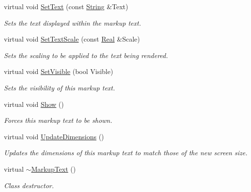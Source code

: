 \begin{DoxyCompactItemize}
virtual void \hyperlink{classMezzanine_1_1UI_1_1MarkupText_aaf712f1b14c1daa74493a7157d1ca789}{SetText} (const \hyperlink{namespaceMezzanine_acf9fcc130e6ebf08e3d8491aebcf1c86}{String} \&Text)
\begin{DoxyCompactList}\small\item\em Sets the text displayed within the markup text. \item\end{DoxyCompactList}\item 
virtual void \hyperlink{classMezzanine_1_1UI_1_1MarkupText_a72af2f6757e01ede3cc6a19b3021c178}{SetTextScale} (const \hyperlink{namespaceMezzanine_a726731b1a7df72bf3583e4a97282c6f6}{Real} \&Scale)
\begin{DoxyCompactList}\small\item\em Sets the scaling to be applied to the text being rendered. \item\end{DoxyCompactList}\item 
virtual void \hyperlink{classMezzanine_1_1UI_1_1MarkupText_acce9a32cef8911ef63a449fe877a2a3b}{SetVisible} (bool Visible)
\begin{DoxyCompactList}\small\item\em Sets the visibility of this markup text. \item\end{DoxyCompactList}\item 
\hypertarget{classMezzanine_1_1UI_1_1MarkupText_a5dd10a957352d800c0c964eddecefeac}{
virtual void \hyperlink{classMezzanine_1_1UI_1_1MarkupText_a5dd10a957352d800c0c964eddecefeac}{Show} ()}
\label{classMezzanine_1_1UI_1_1MarkupText_a5dd10a957352d800c0c964eddecefeac}

\begin{DoxyCompactList}\small\item\em Forces this markup text to be shown. \item\end{DoxyCompactList}\item 
virtual void \hyperlink{classMezzanine_1_1UI_1_1MarkupText_a3a7e102a8b5b3217526ce183465ed69e}{UpdateDimensions} ()
\begin{DoxyCompactList}\small\item\em Updates the dimensions of this markup text to match those of the new screen size. \item\end{DoxyCompactList}\item 
\hypertarget{classMezzanine_1_1UI_1_1MarkupText_a4b67b1166278d87bb7b38fdfbc3577fe}{
virtual \hyperlink{classMezzanine_1_1UI_1_1MarkupText_a4b67b1166278d87bb7b38fdfbc3577fe}{$\sim$MarkupText} ()}
\label{classMezzanine_1_1UI_1_1MarkupText_a4b67b1166278d87bb7b38fdfbc3577fe}

\begin{DoxyCompactList}\small\item\em Class destructor. \item\end{DoxyCompactList}\end{DoxyCompactItemize}
